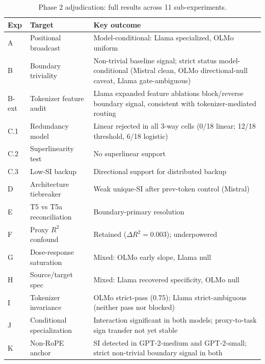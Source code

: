 \documentclass{article}
\begin{document}
\begin{table}[htbp]
    \caption{Phase 2 adjudication: full results across 11 sub-experiments.}
    \centering
    \small
    \begin{tabular}{llp{5.8cm}}
        \toprule
        Exp & Target & Key outcome \\
        \midrule
        A & Positional broadcast & Model-conditional: Llama specialized, OLMo uniform \\
        B & Boundary triviality & Non-trivial baseline signal; strict status model-conditional (Mistral clean, OLMo directional-null caveat, Llama gate-ambiguous) \\
        B-ext & Tokenizer feature audit & Llama expanded feature ablations block/reverse boundary signal, consistent with tokenizer-mediated routing \\
        C.1 & Redundancy model & Linear rejected in all 3-way cells (0/18 linear; 12/18 threshold, 6/18 logistic) \\
        C.2 & Superlinearity test & No superlinear support \\
        C.3 & Low-SI backup & Directional support for distributed backup \\
        D & Architecture tiebreaker & Weak unique-SI after prev-token control (Mistral) \\
        E & T5 vs T5a reconciliation & Boundary-primary resolution \\
        F & Proxy $R^2$ confound & Retained ($\Delta R^2 = 0.003$); underpowered \\
        G & Dose-response saturation & Mixed: OLMo early slope, Llama null \\
        H & Source/target spec & Mixed: Llama recovered specificity, OLMo null \\
        I & Tokenizer invariance & OLMo strict-pass ($0.75$); Llama strict-ambiguous (neither pass nor blocked) \\
        J & Conditional specialization & Interaction significant in both models; proxy-to-task sign transfer not yet stable \\
        K & Non-RoPE anchor & SI detected in GPT-2-medium and GPT-2-small; strict non-trivial boundary signal in both \\
        \bottomrule
    \end{tabular}
\end{table}
\end{document}
